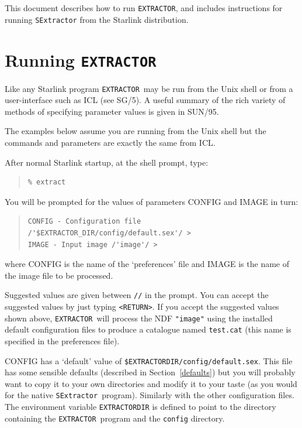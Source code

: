 \documentclass[twoside,11pt]{article}
\newcommand{\htmlref}[2]{#1}
\newcommand{\latex}[1]{#1}
\newcommand{\xref}[3]{#1}
\newcommand{\xlabel}[1]{}
\renewcommand{\_}{\texttt{\symbol{95}}}
\newcommand{\EXTRACTOR}{\texttt{EXTRACTOR}}
\newcommand{\SExtractor}{\texttt{SExtractor}}
\begin{document}
This document describes how to run \EXTRACTOR, and includes
\htmlref{instructions for running \SExtractor}{running_sextractor}
from the Starlink distribution.

\section{\xlabel{running_extractor}Running \EXTRACTOR}

Like any Starlink program \EXTRACTOR\ may be run from the
Unix shell or from a user-interface such as
\xref{ICL}{sg5}{abstract}\latex{ (see SG/5)}.
A useful summary of the rich variety of methods of specifying parameter values
is given in \xref{SUN/95}{sun95}{se_param}.

The examples below assume you are running from the Unix shell but the commands
and parameters are exactly the same from ICL.

After normal Starlink startup, at the shell prompt, type:

\begin{quote} \begin{verbatim}
% extract
\end{verbatim} \end{quote}

You will be prompted for the values of parameters CONFIG and IMAGE in turn:

\begin{quote} \begin{verbatim}
CONFIG - Configuration file /'$EXTRACTOR_DIR/config/default.sex'/ >
IMAGE - Input image /'image'/ >
\end{verbatim} \end{quote}

where CONFIG is the name of the `preferences' file and IMAGE is the name of
the image file to be processed.

Suggested values are given between \texttt{//} in the prompt.  You can
accept the suggested values by just typing \verb!<RETURN>!.  If you
accept the suggested values shown above, \EXTRACTOR\ will process the
NDF \texttt{"image"} using the installed default configuration
files to produce a catalogue named \texttt{test.cat} (this name is
specified in the preferences file).

CONFIG has a `default' value of
\texttt{\$EXTRACTOR\_DIR/config/default.sex}.  This file has some
\htmlref{sensible defaults}{defaults} \latex{(described in
Section~\ref{defaults})} but you will probably want to copy it to your
own directories and modify it to your taste (as you would for the
native \SExtractor\ program).  Similarly with the other configuration
files.  The environment variable \texttt{EXTRACTOR\_DIR} is defined to
point to the directory containing the \EXTRACTOR\ program and the
\texttt{config} directory.
\end{document}

